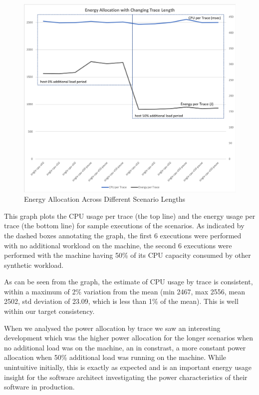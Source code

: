 \begin{figure}
\centering
\includegraphics[width=1.0\textwidth]{Figures/validation-scenariolength}
\caption{Energy Allocation Across Different Scenario Lengths}
\label{figure:validation-scenariolength}
\end{figure}

This graph plots the CPU usage per trace (the top line) and the energy usage per trace (the bottom line) for sample executions of the scenarios.  As indicated by the dashed boxes annotating the graph, the first 6 executions were performed with no additional workload on the machine, the second 6 executions were performed with the machine having 50\% of its CPU capacity consumed by other synthetic workload.

As can be seen from the graph, the estimate of CPU usage by trace is consistent, within a maximum of 2\% variation from the mean (min 2467, max 2556, mean 2502, std deviation of 23.09, which is less than 1\% of the mean).  This is well within our target consistency.

When we analysed the power allocation by trace we saw an interesting development which was the higher power allocation for the longer scenarios when no additional load was on the machine, an in constrast, a more constant power allocation when 50\% additional load was running on the machine.  While unintuitive initially, this is exactly as expected and is an important energy usage insight for the software architect investigating the power characteristics of their software in production.  

